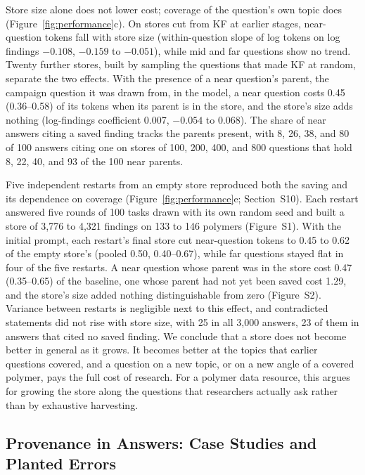 \documentclass[journal=mamobx,manuscript=article]{achemso}
\begin{document}
Store size alone does not lower cost; coverage of the question's own topic does (Figure~\ref{fig:performance}c).
On stores cut from KF at earlier stages, near-question tokens fall with store size (within-question slope of log tokens on log findings $-0.108$, $-0.159$ to $-0.051$), while mid and far questions show no trend.
Twenty further stores, built by sampling the questions that made KF at random, separate the two effects.
With the presence of a near question's parent, the campaign question it was drawn from, in the model, a near question costs 0.45 (0.36--0.58) of its tokens when its parent is in the store, and the store's size adds nothing (log-findings coefficient 0.007, $-0.054$ to 0.068).
The share of near answers citing a saved finding tracks the parents present, with 8, 26, 38, and 80 of 100 answers citing one on stores of 100, 200, 400, and 800 questions that hold 8, 22, 40, and 93 of the 100 near parents.

Five independent restarts from an empty store reproduced both the saving and its dependence on coverage (Figure~\ref{fig:performance}e; Section~S10).
Each restart answered five rounds of 100 tasks drawn with its own random seed and built a store of 3,776 to 4,321 findings on 133 to 146 polymers (Figure~S1).
With the initial prompt, each restart's final store cut near-question tokens to 0.45 to 0.62 of the empty store's (pooled 0.50, 0.40--0.67), while far questions stayed flat in four of the five restarts.
A near question whose parent was in the store cost 0.47 (0.35--0.65) of the baseline, one whose parent had not yet been saved cost 1.29, and the store's size added nothing distinguishable from zero (Figure~S2).
Variance between restarts is negligible next to this effect, and contradicted statements did not rise with store size, with 25 in all 3,000 answers, 23 of them in answers that cited no saved finding.
We conclude that a store does not become better in general as it grows.
It becomes better at the topics that earlier questions covered, and a question on a new topic, or on a new angle of a covered polymer, pays the full cost of research.
For a polymer data resource, this argues for growing the store along the questions that researchers actually ask rather than by exhaustive harvesting.

\subsection{Provenance in Answers: Case Studies and Planted Errors}
\label{sec:cases}
\end{document}
